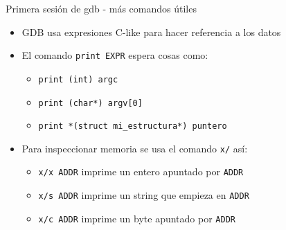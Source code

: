 \documentclass[xetex]{beamer}
\begin{document}
\begin{frame}[fragile]{Primera sesión de gdb - más comandos útiles}
\begin{itemize}
\item GDB usa expresiones C-like para hacer referencia a los datos
\item El comando \verb=print EXPR= espera cosas como:
\begin{itemize}
\item \verb=print (int) argc=
\item \verb=print (char*) argv[0]=
\item \verb=print *(struct mi_estructura*) puntero=
\end{itemize}
\item Para inspeccionar memoria se usa el comando \verb=x/= así:
\begin{itemize}
\item \verb=x/x ADDR= imprime un entero apuntado por \verb=ADDR=
\item \verb=x/s ADDR= imprime un string que empieza en \verb=ADDR=
\item \verb=x/c ADDR= imprime un byte apuntado por \verb=ADDR=
\end{itemize}
\end{itemize}
\end{frame}
\end{document}
